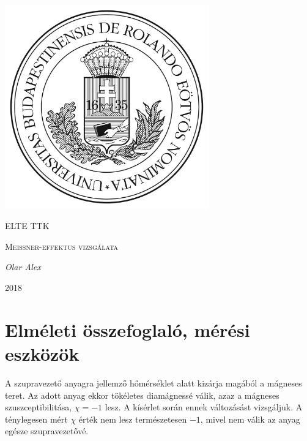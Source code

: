 \documentclass[a4paper,12pt]{article}
\begin{document}
\linespread{1.25}

\begin{titlepage}

	\centering
	\includegraphics[width=0.66\textwidth]{elte.jpg}\par\vspace{1cm}
	{\scshape\LARGE ELTE TTK \par}
	\vspace{3cm}
	{\scshape\Large Meissner-effektus vizsgálata \par}
	\vspace{1cm}
	{\large\itshape Olar Alex\par}
	\vspace{3cm}
	{\large 2018 \par}
	
\end{titlepage}

\tableofcontents

\newpage

\section{Elméleti összefoglaló, mérési eszközök}

\vspace{5mm}

\par A szupravezető anyagra jellemző hőmérséklet alatt kizárja magából a mágneses teret. Az adott anyag ekkor tökéletes diamágnessé válik, azaz a mágneses szuszceptibilitása, $\chi = -1$ lesz. A kísérlet során ennek változásást vizsgáljuk. A ténylegesen mért $\chi$ érték nem lesz természetesen $-1$, mivel nem válik az anyag egésze szupravezetővé.
\end{document}
